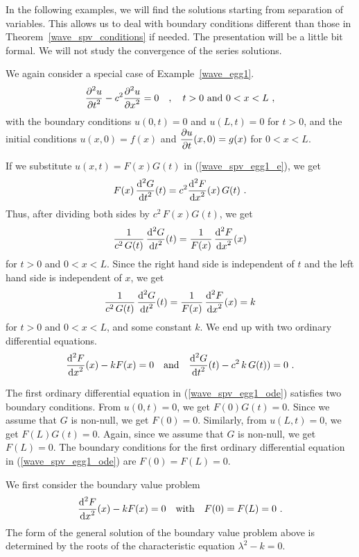 In the following examples, we will find the solutions starting from
separation of variables.  This allows us to deal with boundary
conditions different than those in Theorem~\ref{wave_spv_conditions}
if needed.  The presentation will be a little bit formal.  We will not
study the convergence of the series solutions.

\begin{egg}
We again consider a special case of Example~\ref{wave_egg1}.
\begin{equation} \label{wave_spv_egg1_e}
\frac{\displaystyle \partial^{2}{u}} {\displaystyle \partial t^{2}} - c^2 \frac{\displaystyle \partial^{2}{u}} {\displaystyle \partial x^{2}} = 0 \quad , \quad t>0
\ \text{and} \ 0 < x <L \ ,
\end{equation}
with the boundary conditions $u(0,t) = 0$ and $u(L,t) = 0$ for $t>0$,
and the initial conditions
$u(x,0) = f(x)$ and $\displaystyle \frac{\partial{u}}{\partial t}(x,0) = g(x)$ for
$0 < x < L$.              \label{wave_spv_egg1}

If we substitute $u(x,t) = F(x)G(t)$ in (\ref{wave_spv_egg1_e}), we get
\[
F(x)\,\frac{\displaystyle \mathrm{d}^{2}{G}} {\displaystyle \mathrm{d}{t}^{2}}(t) = c^2 \frac{\displaystyle \mathrm{d}^{2}{F}} {\displaystyle \mathrm{d}{x}^{2}}(x)\, G(t) \ .
\]
Thus, after dividing both sides by $\displaystyle c^2\,F(x)G(t)$, we get
\[
\frac{1}{c^2\,G(t)} \, \frac{\displaystyle \mathrm{d}^{2}{G}} {\displaystyle \mathrm{d}{t}^{2}}(t) =
\frac{1}{F(x)}\, \frac{\displaystyle \mathrm{d}^{2}{F}} {\displaystyle \mathrm{d}{x}^{2}}(x)
\]
for $t>0$ and $0<x<L$.  Since the right hand side is independent of
$t$ and the left hand side is independent of $x$, we get
\[
\frac{1}{c^2\,G(t)} \, \frac{\displaystyle \mathrm{d}^{2}{G}} {\displaystyle \mathrm{d}{t}^{2}}(t) = \frac{1}{F(x)}\,
\frac{\displaystyle \mathrm{d}^{2}{F}} {\displaystyle \mathrm{d}{x}^{2}}(x) = k
\]
for $t>0$ and $0<x<L$, and some constant $k$.  We end up with two
ordinary differential equations.
\begin{equation} \label{wave_spv_egg1_ode}
\frac{\displaystyle \mathrm{d}^{2}{F}} {\displaystyle \mathrm{d}{x}^{2}}(x) -k F(x) = 0 \quad \text{and}
\quad \frac{\displaystyle \mathrm{d}^{2}{G}} {\displaystyle \mathrm{d}{t}^{2}}(t) - c^2\,k\,G(t)) = 0 \ .
\end{equation}

The first ordinary differential equation in (\ref{wave_spv_egg1_ode})
satisfies two boundary conditions.   From $\displaystyle u(0,t) = 0$, we get
$F(0)G(t)=0$.  Since we assume that $G$ is non-null, we get
$F(0)=0$.  Similarly, from $\displaystyle u(L,t) = 0$, we
get $F(L)G(t)=0$.  Again, since we assume that $G$ is non-null, we
get $F(L)=0$.  The boundary conditions for 
the first ordinary differential equation in (\ref{wave_spv_egg1_ode})
are $F(0)=F(L)=0$.

We first consider the boundary value problem
\begin{equation} \label{wave_spv_egg1_bvp}
\dydxn{F}{x}{2}(x) -k F(x) = 0 \quad \text{with} \quad F(0)=F(L)=0  \ .
\end{equation}
The form of the general solution of the boundary value problem above
is determined by the roots of the characteristic equation
$\displaystyle \lambda^2-k=0$.


\end{egg}
